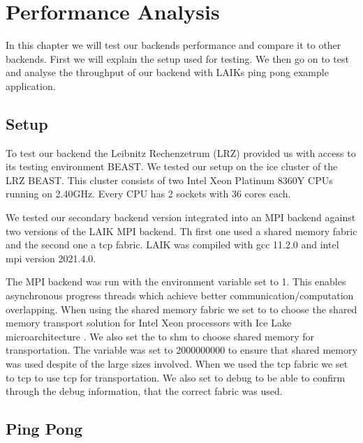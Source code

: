 
\chapter{Performance Analysis}\label{chapter:performance_analysis}

In this chapter we will test our backends performance and compare it to other backends.
First we will explain the setup used for testing.
We then go on to test and analyse the throughput of our backend with LAIKs ping pong example application.

\section{Setup}

To test our backend the Leibnitz Rechenzetrum (LRZ) provided us with access to its testing environment BEAST.
We tested our setup on the ice cluster of the LRZ BEAST. 
This cluster consists of two Intel Xeon Platinum 8360Y CPUs running on 2.40GHz.
Every CPU has 2 sockets with 36 cores each.

We tested our secondary backend version integrated into an MPI backend against two versions of the LAIK MPI backend. 
Th first one used a shared memory fabric and the second one a tcp fabric.
LAIK was compiled with gcc 11.2.0 and intel mpi version 2021.4.0.

The MPI backend was run with the environment variable  set to 1.
This enables asynchronous progress threads which achieve better communication/computation overlapping\cite{intel-mpi}. 
When using the shared memory fabric we set  to  to choose the shared memory transport solution for Intel Xeon processors with Ice Lake microarchitecture \cite{intel-mpi}.
We also set the  to shm to choose shared memory for transportation.
The  variable was set to 2000000000 to ensure that shared memory was used despite of the large sizes involved.
When we used the tcp fabric we set  to tcp to use tcp for transportation.
We also set  to debug to be able to confirm through the debug information, that the correct fabric was used\cite{intel-mpi}.

\section{Ping Pong}

